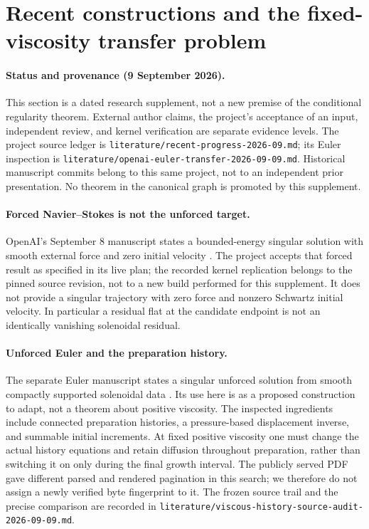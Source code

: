 \section{Recent constructions and the fixed-viscosity transfer problem}
\label{vh:source-scope}

\paragraph{Status and provenance (9 September 2026).}
This section is a dated research supplement, not a new premise of the
conditional regularity theorem. External author claims, the project's
acceptance of an input, independent review, and kernel verification are
separate evidence levels. The project source ledger is
\texttt{literature/recent-progress-2026-09.md}; its Euler inspection is
\texttt{literature/openai-euler-transfer-2026-09-09.md}.
Historical manuscript commits belong to this same project, not to an
independent prior presentation. No theorem in the canonical graph is
promoted by this supplement.

\paragraph{Forced Navier--Stokes is not the unforced target.}
OpenAI's September 8 manuscript states a bounded-energy singular solution
with smooth external force and zero initial velocity
\cite{OpenAINavier2026}. The project accepts that forced result as specified
in its live plan; the recorded kernel replication belongs to the pinned
source revision, not to a new build performed for this supplement.
It does not provide a singular trajectory with zero force and nonzero
Schwartz initial velocity. In particular a residual flat at the candidate
endpoint is not an identically vanishing solenoidal residual.

\paragraph{Unforced Euler and the preparation history.}
The separate Euler manuscript states a singular unforced solution from
smooth compactly supported solenoidal data \cite{OpenAIEuler2026}.
Its use here is as a proposed construction to adapt, not a theorem about
positive viscosity. The inspected ingredients include connected preparation
histories, a pressure-based displacement inverse, and summable initial
increments. At fixed positive viscosity one must change the actual
history equations and retain diffusion throughout preparation, rather than
switching it on only during the final growth interval. The publicly
served PDF gave different parsed and rendered pagination in this search;
we therefore do not assign a newly verified byte fingerprint to it.
The frozen source trail and the precise comparison are recorded in
\texttt{literature/viscous-history-source-audit-2026-09-09.md}.

